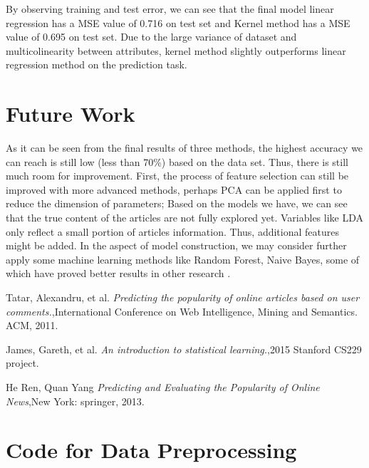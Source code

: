 \documentclass[letterpaper,12pt]{article}
\begin{document}
By observing training and test error, we can see that the final model linear regression has a MSE value of 0.716 on test set and Kernel method has a MSE value of 0.695 on test set. Due to the large variance of dataset and multicolinearity between attributes, kernel method slightly outperforms linear regression method on the prediction task. 

\section{Future Work}
As it can be seen from the final results of three methods, the highest accuracy we can reach is still low (less than 70\%) based on the data set. Thus, there is still much room for improvement. First, the process of feature selection can still be improved with more advanced methods, perhaps PCA can be applied first to reduce the dimension of parameters; Based on the models we have, we can see that the true content of the articles are not fully explored yet. Variables like LDA only reflect a small portion of articles information. Thus, additional features might be added. In the aspect of model construction, we may consider further apply some machine learning methods like Random Forest, Naive Bayes, some of which have proved better results in other research \cite{a2}. 



\begin{thebibliography}{99}

Tatar, Alexandru, et al. \textit{Predicting the popularity of online articles based on user comments.},International Conference on Web Intelligence, Mining and Semantics. ACM, 2011.

James, Gareth, et al. \textit{An introduction to statistical learning.},2015 Stanford CS229 project.

He Ren, Quan Yang \textit{Predicting and Evaluating the Popularity of Online News},New York: springer, 2013.

\end{thebibliography}

\newpage
\appendix
\section{Code for Data Preprocessing}
\end{document}
